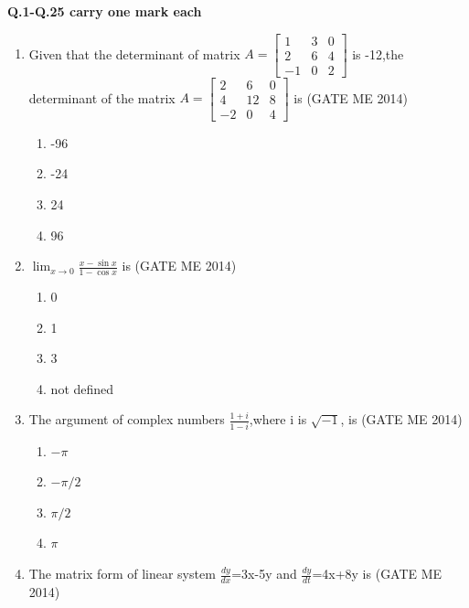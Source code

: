 \documentclass[journal]{IEEEtran}
\numberwithin{equation}{enumi}
\numberwithin{figure}{enumi}
\begin{document}
\newpage
\textbf{Q.1-Q.25 carry one mark each}
\begin{enumerate}

\item  Given that the determinant of matrix \( A = \begin{bmatrix} 1 & 3 & 0 \\ 2 & 6 & 4 \\ -1 & 0 &  2 \end{bmatrix} \) is -12,the determinant of the matrix \( A = \begin{bmatrix} 2 & 6 & 0 \\ 4 & 12 & 8 \\ -2 & 0 & 4 \end{bmatrix} \) is 
\hfill{(GATE ME 2014)}
 \begin{multicols}{4}
 \begin{enumerate}
         \item -96
         \item -24
         \item 24
         \item 96
     \end{enumerate}
 \end{multicols}
 \item 
 $\lim_{x \to 0} \frac{x - \sin x}{1 - \cos x}$ is
 \hfill{(GATE ME 2014)}
 \begin{multicols}{4}
\begin{enumerate}
 \item 0
 \item 1
 \item 3
 \item not defined
\end{enumerate}
 \end{multicols}
\item The argument of complex numbers $\frac{1+i}{1-i}$,where i is $\sqrt{-1}$, is
\hfill{(GATE ME 2014)}
\begin{multicols}{4}
    \begin{enumerate}
        \item $-\pi$
        \item $-\pi/2$
        \item $\pi/2$
        \item $\pi$
        \end{enumerate}
        \end{multicols}
\item The matrix form of linear system $\frac{dy}{dx}$=3x-5y and $\frac{dy
   }{dt}$=4x+8y is
\hfill{(GATE ME 2014)}

\end{enumerate}
\end{document}
